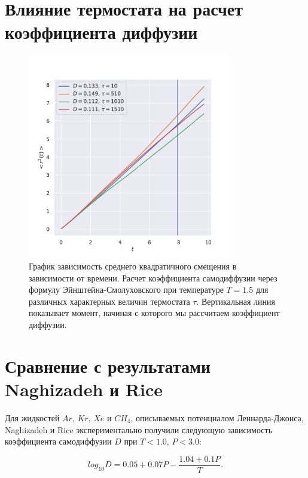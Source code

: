 \documentclass[a4paper,12pt]{article}
\begin{document}
\section{Влияние термостата на расчет коэффициента диффузии}

\begin{figure}[H]
    \centering
    \includegraphics[width=0.8\textwidth]{../../media/thermostat.pdf}
\caption{График зависимость среднего квадратичного
смещения в зависимости от времени. Расчет коэффициента
самодиффузии через формулу Эйнштейна-Смолуховского при
температуре \(T = 1.5\) для различных характерных 
величин термостата \(\tau\).
Вертикальная линия показывает момент, начиная с которого 
мы рассчитаем коэффициент диффузии.}
\end{figure}

\section{Сравнение с результатами Naghizadeh и Rice}

Для жидкостей \(Ar\), \(Kr\), \(Xe\) и \(CH_4\), 
описываемых потенциалом Леннарда-Джонса,
Naghizadeh и Rice экспериментально получили следующую 
зависимость коэффициента самодиффузии \(D\)
при \(T < 1.0\), \(P < 3.0\):

\[
    log_{10} D = 0.05 + 0.07 
    P - \frac{1.04 + 0.1 P}{T}.
\] 
\end{document}
